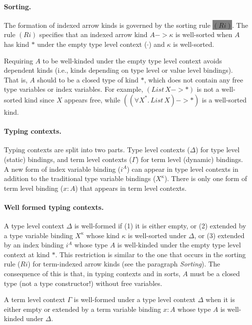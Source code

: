\documentclass{llncs}
\newcommand{\newFi}[1]{\colorbox{grey}{\ensuremath{#1}}}
\newcommand{\ie}{{i.e.}}
\begin{document}
\paragraph{Sorting.} \label{sorting}
The formation of indexed arrow kinds is
governed by the sorting rule \newFi{(Ri)}. The rule $(Ri)$ specifies that
an indexed arrow kind $A -> \kappa$ is well-sorted when $A$ has kind $*$
under the empty type level context ($\cdot$) and $\kappa$ is well-sorted.

Requiring $A$ to be well-kinded under the empty type level context avoids
dependent kinds (\ie, kinds depending on type level or value level bindings).
That is, $A$ should to be a closed type of kind $*$,
which does not contain any free type variables or index variables.
For example, $(\textit{List}\,X -> *)$ is not a well-sorted kind since $X$
appears free, while $((\forall X^{*}\!.\,\textit{List}\,X) -> *)$ is a well-sorted kind.

\paragraph{Typing contexts.}
Typing contexts are split into two parts.
Type level contexts ($\Delta$) for type level (static) bindings,
and term level contexts ($\Gamma$) for term level (dynamic) bindings.
A new form of index variable binding ($i^A$) can appear in
type level contexts in addition to the traditional type variable bindings ($X^\kappa$).
There is only one form of term level binding ($x:A$) that appears in
term level contexts.

\paragraph{Well formed typing contexts.}
A type level context $\Delta$ is well-formed if (1) it is either empty,
or (2) extended by a type variable binding $X^\kappa$ whose kind $\kappa$ is
well-sorted under $\Delta$, or (3) extended by an index binding $i^A$
whose type $A$ is well-kinded under the empty type level context at kind $*$.
This restriction is similar to the one that occurs in the sorting rule ($Ri$)
for term-indexed arrow kinds (see the paragraph {\textit{Sorting}}).
The consequence of this is that, in typing contexts and in sorts,
$A$ must be a closed type (not a type constructor!) without free variables.

A term level context $\Gamma$ is well-formed under a type level context
$\Delta$ when it is either empty or extended by a term variable binding
$x:A$ whose type $A$ is well-kinded under $\Delta$.
\end{document}
